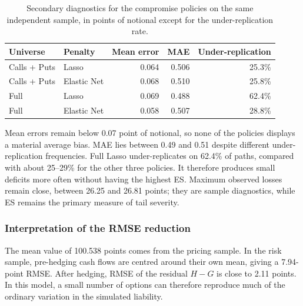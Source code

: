 \begin{table}[htbp]
\centering
\small
\begin{tabular}{llrrr}
\toprule
Universe & Penalty & Mean error & MAE & Under-replication \\
\midrule
Calls + Puts & Lasso & 0.064 & 0.506 & 25.3\% \\
Calls + Puts & Elastic Net & 0.068 & 0.510 & 25.8\% \\
Full & Lasso & 0.069 & 0.488 & 62.4\% \\
Full & Elastic Net & 0.058 & 0.507 & 28.8\% \\
\bottomrule
\end{tabular}
\caption{Secondary diagnostics for the compromise policies on the same independent sample, in points of notional except for the under-replication rate.}
\label{tab:secondary-risk-metrics}
\end{table}



Mean errors remain below 0.07 point of notional, so none of the policies displays
a material average bias. MAE lies between 0.49 and 0.51 despite different
under-replication frequencies. Full Lasso under-replicates on 62.4\% of paths,
compared with about 25--29\% for the other three policies. It therefore produces
small deficits more often without having the highest ES. Maximum observed losses
remain close, between 26.25 and 26.81 points; they are sample diagnostics, while
ES remains the primary measure of tail severity.

\subsubsection*{Interpretation of the RMSE reduction}

The mean value of 100.538 points comes from the pricing sample. In the risk sample, pre-hedging cash flows are centred around their own mean, giving a 7.94-point RMSE. After hedging, RMSE of the residual $H-G$ is close to 2.11 points. In this model, a small number of options can therefore reproduce much of the ordinary variation in the simulated liability.

